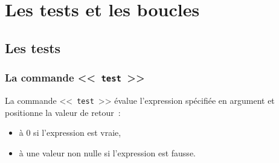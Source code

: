 %
%

\setcounter{remarque-cnt}{1}
\setcounter{example-cnt}{1}
\chapter{Les tests et les boucles}
\thispagestyle{fancy}

\section{Les tests}

\subsection{La commande <<~\texttt{test}~>>}

La commande <<~\texttt{test}~>> {\'e}value l'expression sp{\'e}cifi{\'e}e en argument et positionne la valeur de retour~:
\begin{itemize}
	\item	{\`a} 0 si l'expression est vraie,
	\item	{\`a} une valeur non nulle si l'expression est fausse.
\end{itemize}

